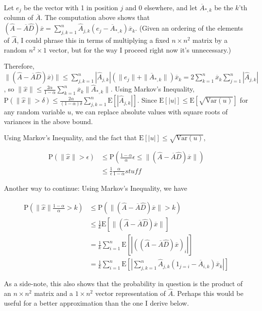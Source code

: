 \documentclass{article}
\newcommand \E[1] {\mathrm E \left[#1\right]} %
\newcommand \Var[1] {\mathrm {Var} \left(#1\right)} %
\newcommand \p[1] {\mathrm P \left(#1\right)}
\begin{document}
Let $e_j$ be the vector with 1 in position $j$ and 0 elsewhere, and let $\overline A_{*,k}$ be the $k$'th column of $\overline A$. The computation above shows that $(\hat A-\overline A\hat D)\overline x = \sum_{j,k=1}^n \hat A_{j,k}(e_j-\overline A_{*,k})\overline x_k$. (Given an ordering of the elements of $\hat A$, I could phrase this in terms of multiplying a fixed $n\times n^2$ matrix by a random $n^2\times 1$ vector, but for the way I proceed right now it's unnecessary.)

Therefore, $\|(\hat A-\overline A\hat D)\overline x)\| \leq \sum_{j,k=1}^n |\hat A_{j,k}|(\|e_j\|+\|\overline A_{*,k}\|)\overline x_k = 2\sum_{k=1}^n \overline x_k \sum_{j=1}^n |\hat A_{j,k}|$, so $\|\hat x\| \leq \frac{2\alpha}{1-\alpha}\sum_{k=1}^n \overline x_k \|\hat A_{*,k}\|$. Using Markov's Inequality, $\p{\|\hat x\|>\delta} \leq \frac{2\alpha}{(1-\alpha)\delta} \sum_{j,k=1}^n \E{|\hat A_{j,k}|}$. Since $\E{|u|} \leq \E{\sqrt{\Var{u}}}$ for any random variable $u$, we can replace absolute values with square roots of variances in the above bound.

Using Markov's Inequality, and the fact that $\E{|u|} \leq \sqrt{\Var{u}}$,

\begin{align*}
\p{\|\hat x\|>\epsilon} &\leq \p{\frac{1-\alpha}\alpha \epsilon \leq \|(\hat A-\overline A\hat D)\overline x\|} \\
&\leq \frac 1 \epsilon \frac\alpha{1-\alpha} stuff
\end{align*}

Another way to continue: Using Markov's Inequality, we have

\begin{align*}
\p{\|\hat x\| \frac{1-\alpha}\alpha > k} &\leq \p{\|(\hat A - \overline A\hat D)\overline x\| > k} \\
&\leq \frac 1 k \E{\|(\hat A - \overline A\hat D)\overline x\|} \\
&= \frac 1 k \sum_{i=1}^n \E {\left| \left((\hat A - \overline A\hat D)\overline x\right)_i \right|} \\
&= \frac 1 k \sum_{i=1}^n \E{\left| \sum_{j,k=1}^n \hat A_{j,k}(1_{j=i} - \overline A_{i,k})\overline x_k \right|}
\end{align*}

As a side-note, this also shows that the probability in question is the product of an $n\times n^2$ matrix and a $1\times n^2$ vector representation of $\hat A$. Perhaps this would be useful for a better approximation than the one I derive below.
\end{document}
